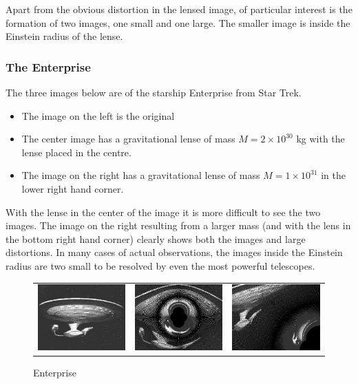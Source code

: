 \documentclass[a4paper]{IEEEtran}
\begin{document}
Apart from the obvious distortion in the lensed image, of particular
interest is the formation of two images, one small and one large.
The smaller image is inside the Einstein radius of the lense.

\subsubsection{The Enterprise}
The three images below are of the starship Enterprise from Star Trek.
\begin{itemize}
    \item The image on the left is the original
    \item The center image has a gravitational lense of mass
          $M = 2 \times 10^{30}$ kg with the lense placed in the 
          centre.
    \item The image on the right has a gravitational lense of
          mass $M = 1 \times 10^{31}$ in the lower right hand corner.
\end{itemize}
With the lense in the center of the image it is more difficult to 
see the two images. The image on the right resulting from a larger
mass (and with the lens in the bottom right hand corner)
clearly shows both the images and large distortions.
In many cases of actual observations, the images inside the Einstein radius
are two small to be resolved by even the most powerful telescopes.

\begin{figure}[ht]
    \caption{Enterprise} 
    \label{fig:enterprise} 
    \begin{center}
        \begin{tabular}{ccc}
            \includegraphics[width=0.3\columnwidth]{pics/1701.eps} &
            \includegraphics[width=0.3\columnwidth]{pics/ent_2e30.eps} &
            \includegraphics[width=0.3\columnwidth]{pics/ent_1e31.eps} 
        \end{tabular}
    \end{center}
\end{figure}
\end{document}
